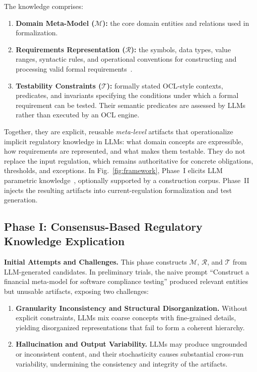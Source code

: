 The knowledge comprises:
\begin{enumerate}[leftmargin=*,align=left,label=(\arabic*), itemsep=0pt, parsep=0pt, nosep]

\item \textbf{Domain Meta-Model ($\mathcal{M}$):}
the core domain entities and relations used in formalization.

\item \textbf{Requirements Representation ($\mathcal{R}$):}
the symbols, data types, value ranges, syntactic rules, and operational
conventions for constructing and processing valid formal
requirements~\cite{silberschatz2005database}.

\item \textbf{Testability Constraints ($\mathcal{T}$):}
formally stated OCL-style contexts, predicates, and invariants specifying the
conditions under which a formal requirement can be tested. Their semantic
predicates are assessed by LLMs rather than executed by an OCL engine.

\end{enumerate}
Together, they are explicit, reusable \emph{meta-level} artifacts that
operationalize implicit regulatory knowledge in LLMs: what domain concepts are
expressible, how requirements are represented, and what makes them testable.
They do not replace the input regulation, which remains authoritative for
concrete obligations, thresholds, and exceptions. In
Fig.~\ref{fig:framework}, Phase~I elicits LLM parametric
knowledge~\cite{zhang2023large,lu2025tacit}, optionally supported by a
construction corpus. Phase~II injects the resulting artifacts into
current-regulation formalization and test generation.


\subsection{Phase I: Consensus-Based Regulatory Knowledge Explication}
\label{sec:know_ext}


\noindent
\textbf{Initial Attempts and Challenges.}
This phase constructs $\mathcal{M}$, $\mathcal{R}$, and $\mathcal{T}$ from
LLM-generated candidates.
In preliminary trials, the naive prompt ``Construct a financial meta-model for
software compliance testing'' produced relevant entities but unusable
artifacts, exposing two challenges:
\begin{enumerate}[leftmargin=*,align=left,label=(\arabic*), itemsep=0pt, parsep=0pt, nosep]
    \item \textbf{Granularity Inconsistency and Structural Disorganization.} Without explicit constraints, LLMs mix coarse concepts with fine-grained details, yielding disorganized representations that fail to form a coherent hierarchy.
    \item \textbf{Hallucination and Output Variability.} LLMs may produce ungrounded or inconsistent content, and their stochasticity causes substantial cross-run variability, undermining the consistency and integrity
    of the artifacts.
\end{enumerate}


